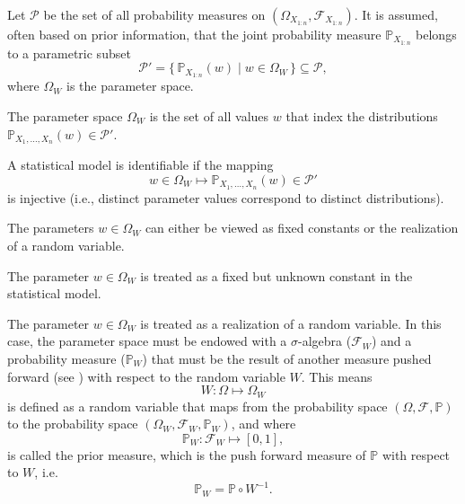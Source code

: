 \begin{definition}
	Let $\mathcal{P}$ be the set of all probability measures on $(\Omega_{X_{1:n}},\mathcal{F}_{X_{1:n}})$. It is assumed, often based on prior information, that the joint probability measure $\mathbb{P}_{X_{1:n}}$ belongs to a parametric subset
	\begin{equation}
		\mathcal{P}' = \{\, \mathbb{P}_{X_{1:n}}(w) \mid w \in \Omega_W \,\} \subseteq \mathcal{P},
	\end{equation}
	where $\Omega_W$ is the parameter space.
\end{definition}

\begin{definition}
	\label{def:parameter_space}
	The parameter space $\Omega_W$ is the set of all values $w$ that index the distributions $\mathbb{P}_{X_1,\dots,X_n}(w)\in \mathcal{P}'$.
\end{definition}

\begin{definition}
	A statistical model is identifiable if the mapping 
	\begin{equation}
		w \in \Omega_W \mapsto \mathbb{P}_{X_1,\dots,X_n}(w) \in \mathcal{P}'
	\end{equation}
	is injective (i.e., distinct parameter values correspond to distinct distributions).
\end{definition}

The parameters $w\in \Omega_W$ can either be viewed as fixed constants or the realization of a random variable.
\begin{axiom}
	\label{ax:parameter_fixed}
	The parameter $w\in \Omega_W$ is treated as a fixed but unknown constant in the statistical model.
\end{axiom}
\begin{axiom}
	\label{ax:parameter_variable}
	The parameter $w\in \Omega_W$ is treated as a realization of a random variable. In this case, the parameter space must be endowed with a $\sigma$-algebra ($\mathcal{F}_W$) and a probability measure ($\mathbb{P}_W$) that must be the result of another measure pushed forward (see ) with respect to the random variable $W$. This means
	\begin{equation}
		W: \Omega \mapsto \Omega_W
	\end{equation}
	is defined as a random variable that maps from the probability space $(\Omega, \mathcal{F}, \mathbb{P})$ to the probability space $(\Omega_W,\mathcal{F}_W,\mathbb{P}_W)$, and where
	\begin{equation}
		\mathbb{P}_W: \mathcal{F}_W \mapsto [0,1],
	\end{equation}
	is called the prior measure, which is the push forward measure of $\mathbb{P}$ with respect to $W$, i.e.
	\begin{equation}
		\mathbb{P}_W = \mathbb{P}\circ W^{-1}.
	\end{equation}
\end{axiom}

